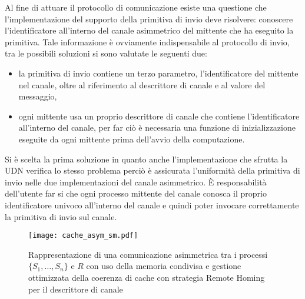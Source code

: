 Al fine di attuare il protocollo di comunicazione esiste una questione che l'implementazione del supporto della primitiva di invio deve risolvere: conoscere l'identificatore all'interno del canale asimmetrico del mittente che ha eseguito la primitiva. Tale informazione \`e ovviamente indispensabile al protocollo di invio, tra le possibili soluzioni si sono valutate le seguenti due:
\begin{itemize}    
\item la primitiva di invio contiene un terzo parametro, l'identificatore del mittente nel canale, oltre al riferimento al descrittore di canale e al valore del messaggio,
\item ogni mittente usa un proprio descrittore di canale che contiene l'identificatore all'interno del canale, per far ci\`o \`e necessaria una funzione di inizializzazione eseguite da ogni mittente prima dell'avvio della computazione.
\end{itemize}
Si \`e scelta la prima soluzione in quanto anche l'implementazione che sfrutta la UDN verifica lo stesso problema perci\`o \`e assicurata l'uniformit\`a della primitiva di invio nelle due implementazioni del canale asimmetrico. \`E responsabilit\`a dell'utente far si che ogni processo mittente del canale conosca il proprio identificatore univoco all'interno del canale e quindi poter invocare correttamente la primitiva di invio sul canale.
\begin{figure}[!tb]
  \texttt{[image: cache\_asym\_sm.pdf]}
  \centering
  \caption[Comunicazione asimmetrica su memoria condivisa]{Rappresentazione di una comunicazione asimmetrica tra i processi $\{S_1, \ldots, S_n\}$ e $R$ con uso della memoria condivisa e gestione ottimizzata della coerenza di cache con strategia Remote Homing per il descrittore di canale}
  \label{fig:cache_asym_sm}
\end{figure}

\FloatBarrier
